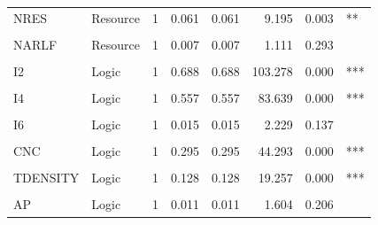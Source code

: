 \documentclass[preprint,
3p]{elsarticle} %
\begin{document}
\begin{longtable}[t]{llrrrrrl}
NRES & Resource & 1 & 0.061 & 0.061 & 9.195 & 0.003 & **\\
\cellcolor{gray!10}{A RS} & \cellcolor{gray!10}{Resource} & \cellcolor{gray!10}{1} & \cellcolor{gray!10}{0.367} & \cellcolor{gray!10}{0.367} & \cellcolor{gray!10}{55.057} & \cellcolor{gray!10}{0.000} & \cellcolor{gray!10}{***}\\
NARLF & Resource & 1 & 0.007 & 0.007 & 1.111 & 0.293 & \\
\cellcolor{gray!10}{TASKS} & \cellcolor{gray!10}{Logic} & \cellcolor{gray!10}{1} & \cellcolor{gray!10}{0.495} & \cellcolor{gray!10}{0.495} & \cellcolor{gray!10}{74.347} & \cellcolor{gray!10}{0.000} & \cellcolor{gray!10}{***}\\
\addlinespace
I2 & Logic & 1 & 0.688 & 0.688 & 103.278 & 0.000 & ***\\
\cellcolor{gray!10}{I3} & \cellcolor{gray!10}{Logic} & \cellcolor{gray!10}{1} & \cellcolor{gray!10}{1.424} & \cellcolor{gray!10}{1.424} & \cellcolor{gray!10}{213.805} & \cellcolor{gray!10}{0.000} & \cellcolor{gray!10}{***}\\
I4 & Logic & 1 & 0.557 & 0.557 & 83.639 & 0.000 & ***\\
\cellcolor{gray!10}{I5} & \cellcolor{gray!10}{Logic} & \cellcolor{gray!10}{1} & \cellcolor{gray!10}{0.110} & \cellcolor{gray!10}{0.110} & \cellcolor{gray!10}{16.534} & \cellcolor{gray!10}{0.000} & \cellcolor{gray!10}{***}\\
I6 & Logic & 1 & 0.015 & 0.015 & 2.229 & 0.137 & \\
\addlinespace
\cellcolor{gray!10}{C} & \cellcolor{gray!10}{Logic} & \cellcolor{gray!10}{1} & \cellcolor{gray!10}{0.002} & \cellcolor{gray!10}{0.002} & \cellcolor{gray!10}{0.344} & \cellcolor{gray!10}{0.558} & \cellcolor{gray!10}{}\\
CNC & Logic & 1 & 0.295 & 0.295 & 44.293 & 0.000 & ***\\
\cellcolor{gray!10}{OS} & \cellcolor{gray!10}{Logic} & \cellcolor{gray!10}{1} & \cellcolor{gray!10}{1.094} & \cellcolor{gray!10}{1.094} & \cellcolor{gray!10}{164.246} & \cellcolor{gray!10}{0.000} & \cellcolor{gray!10}{***}\\
TDENSITY & Logic & 1 & 0.128 & 0.128 & 19.257 & 0.000 & ***\\
\cellcolor{gray!10}{XDENSITY} & \cellcolor{gray!10}{Logic} & \cellcolor{gray!10}{1} & \cellcolor{gray!10}{0.218} & \cellcolor{gray!10}{0.218} & \cellcolor{gray!10}{32.724} & \cellcolor{gray!10}{0.000} & \cellcolor{gray!10}{***}\\
\addlinespace
AP & Logic & 1 & 0.011 & 0.011 & 1.604 & 0.206 & \\

\end{longtable}
\end{document}
